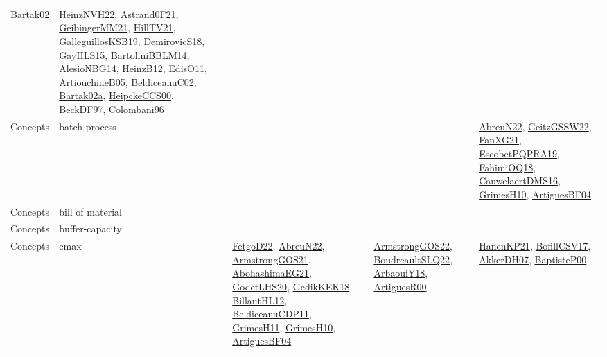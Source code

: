 {\begin{longtable}{lp{3cm}>{\raggedright}p{6cm}>{\raggedright}p{6cm}p{8cm}}
\href{papers/Bartak02.pdf}{Bartak02}\cite{Bartak02} & \href{articles/HeinzNVH22.pdf}{HeinzNVH22}\cite{HeinzNVH22}, \href{papers/Astrand0F21.pdf}{Astrand0F21}\cite{Astrand0F21}, \href{papers/GeibingerMM21.pdf}{GeibingerMM21}\cite{GeibingerMM21}, \href{papers/HillTV21.pdf}{HillTV21}\cite{HillTV21}, \href{papers/GalleguillosKSB19.pdf}{GalleguillosKSB19}\cite{GalleguillosKSB19}, \href{papers/DemirovicS18.pdf}{DemirovicS18}\cite{DemirovicS18}, \href{papers/GayHLS15.pdf}{GayHLS15}\cite{GayHLS15}, \href{papers/BartoliniBBLM14.pdf}{BartoliniBBLM14}\cite{BartoliniBBLM14}, \href{papers/AlesioNBG14.pdf}{AlesioNBG14}\cite{AlesioNBG14}, \href{papers/HeinzB12.pdf}{HeinzB12}\cite{HeinzB12}, \href{papers/EdisO11.pdf}{EdisO11}\cite{EdisO11}, \href{papers/ArtiouchineB05.pdf}{ArtiouchineB05}\cite{ArtiouchineB05}, \href{papers/BeldiceanuC02.pdf}{BeldiceanuC02}\cite{BeldiceanuC02}, \href{papers/Bartak02a.pdf}{Bartak02a}\cite{Bartak02a}, \href{articles/HeipckeCCS00.pdf}{HeipckeCCS00}\cite{HeipckeCCS00}, \href{papers/BeckDF97.pdf}{BeckDF97}\cite{BeckDF97}, \href{papers/Colombani96.pdf}{Colombani96}\cite{Colombani96}\\
Concepts & batch process &  &  & \href{articles/AbreuN22.pdf}{AbreuN22}\cite{AbreuN22}, \href{papers/GeitzGSSW22.pdf}{GeitzGSSW22}\cite{GeitzGSSW22}, \href{articles/FanXG21.pdf}{FanXG21}\cite{FanXG21}, \href{articles/EscobetPQPRA19.pdf}{EscobetPQPRA19}\cite{EscobetPQPRA19}, \href{articles/FahimiOQ18.pdf}{FahimiOQ18}\cite{FahimiOQ18}, \href{papers/CauwelaertDMS16.pdf}{CauwelaertDMS16}\cite{CauwelaertDMS16}, \href{papers/GrimesH10.pdf}{GrimesH10}\cite{GrimesH10}, \href{papers/ArtiguesBF04.pdf}{ArtiguesBF04}\cite{ArtiguesBF04}\\
Concepts & bill of material &  &  & \\
Concepts & buffer-capacity &  &  & \\
Concepts & cmax & \href{articles/FetgoD22.pdf}{FetgoD22}\cite{FetgoD22}, \href{articles/AbreuN22.pdf}{AbreuN22}\cite{AbreuN22}, \href{papers/ArmstrongGOS21.pdf}{ArmstrongGOS21}\cite{ArmstrongGOS21}, \href{articles/AbohashimaEG21.pdf}{AbohashimaEG21}\cite{AbohashimaEG21}, \href{papers/GodetLHS20.pdf}{GodetLHS20}\cite{GodetLHS20}, \href{articles/GedikKEK18.pdf}{GedikKEK18}\cite{GedikKEK18}, \href{papers/BillautHL12.pdf}{BillautHL12}\cite{BillautHL12}, \href{articles/BeldiceanuCDP11.pdf}{BeldiceanuCDP11}\cite{BeldiceanuCDP11}, \href{papers/GrimesH11.pdf}{GrimesH11}\cite{GrimesH11}, \href{papers/GrimesH10.pdf}{GrimesH10}\cite{GrimesH10}, \href{papers/ArtiguesBF04.pdf}{ArtiguesBF04}\cite{ArtiguesBF04} & \href{papers/ArmstrongGOS22.pdf}{ArmstrongGOS22}\cite{ArmstrongGOS22}, \href{papers/BoudreaultSLQ22.pdf}{BoudreaultSLQ22}\cite{BoudreaultSLQ22}, \href{papers/ArbaouiY18.pdf}{ArbaouiY18}\cite{ArbaouiY18}, \href{articles/ArtiguesR00.pdf}{ArtiguesR00}\cite{ArtiguesR00} & \href{papers/HanenKP21.pdf}{HanenKP21}\cite{HanenKP21}, \href{papers/BofillCSV17.pdf}{BofillCSV17}\cite{BofillCSV17}, \href{papers/AkkerDH07.pdf}{AkkerDH07}\cite{AkkerDH07}, \href{articles/BaptisteP00.pdf}{BaptisteP00}\cite{BaptisteP00}\\

\end{longtable}}
